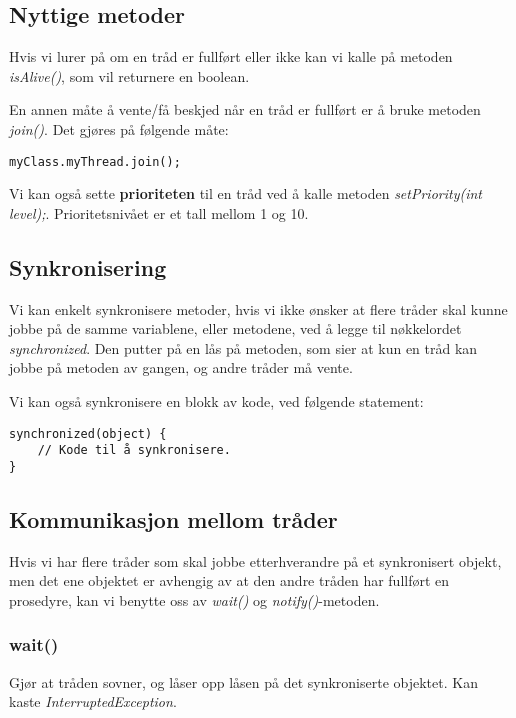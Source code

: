 \documentclass[a4paper,norsk,10pt]{article}
\begin{document}
\subsection{Nyttige metoder}
\label{sec-21.2}


Hvis vi lurer på om en tråd er fullført eller ikke kan vi kalle på
metoden \emph{isAlive()}, som vil returnere en boolean.

En annen måte å vente/få beskjed når en tråd er fullført er å bruke
metoden \emph{join()}. Det gjøres på følgende måte:

\begin{verbatim}
myClass.myThread.join();
\end{verbatim}

Vi kan også sette \textbf{prioriteten} til en tråd ved å kalle metoden
\emph{setPriority(int level);}. Prioritetsnivået er et tall mellom 1
og 10. 
\subsection{Synkronisering}
\label{sec-21.3}


Vi kan enkelt synkronisere metoder, hvis vi ikke ønsker at flere
tråder skal kunne jobbe på de samme variablene, eller metodene, ved å
legge til nøkkelordet \emph{synchronized}. Den putter på en lås på metoden,
som sier at kun en tråd kan jobbe på metoden av gangen, og andre
tråder må vente.

Vi kan også synkronisere en blokk av kode, ved følgende statement:

\begin{verbatim}
synchronized(object) { 
    // Kode til å synkronisere.
}
\end{verbatim}
\subsection{Kommunikasjon mellom tråder}
\label{sec-21.4}


Hvis vi har flere tråder som skal jobbe etterhverandre på et
synkronisert objekt, men det ene objektet er avhengig av at den andre
tråden har fullført en prosedyre, kan vi benytte oss av \emph{wait()} og
\emph{notify()}-metoden. 
\subsubsection{wait()}
\label{sec-21.4.1}


Gjør at tråden sovner, og låser opp låsen på det synkroniserte
objektet. Kan kaste \emph{InterruptedException}.
\end{document}
